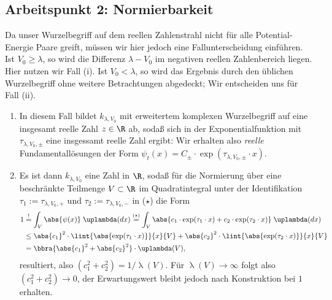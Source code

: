 \documentclass{subfiles}
\begin{document}
    \subsection{Arbeitspunkt 2: Normierbarkeit}
        Da unser Wurzelbegriff auf dem reellen Zahlenstrahl nicht für alle Potential-Energie Paare greift, müssen wir hier jedoch eine Fallunterscheidung einführen. Ist $V_0\geq \lambda$, so wird die Differenz $\lambda - V_0$ im negativen reellen Zahlenbereich liegen. Hier nutzen wir Fall (i). Ist $V_0 < \lambda$, so wird das Ergebnis durch den üblichen Wurzelbegriff ohne weitere Betrachtungen abgedeckt; Wir entscheiden uns für Fall (ii). 
        \begin{enumerate}[label=(\roman*)]
            \item In diesem Fall bildet $k_{\lambda,V_0}$ mit erweitertem komplexen Wurzelbegriff auf eine insgesamt reelle Zahl $z\in\R$ ab, sodaß sich in der Exponentialfunktion mit $\tau_{\lambda,V_0,\pm}$ eine insgessamt reelle Zahl ergibt: Wir erhalten also \emph{reelle} Fundamentallösungen der Form $\psi_t(x) = C_\pm\cdot\exp(\tau_{\lambda,V_0,\pm}\cdot x)$.
            \item Es ist dann $k_{\lambda,V_0}$ eine Zahl in $\R$, sodaß für die Normierung über eine beschränkte Teilmenge $V\subset\R$ im Quadratintegral unter der Identifikation $\tau_1 := \tau_{\lambda,V_0,+}$ und $\tau_2 := \tau_{\lambda,V_0,-}$ in ($\star$) die Form
            \begin{align*}
                1 &\stackrel{!}{=} \int_V\abs{\psi(x)}\;\uplambda(dx) \stackrel{(\star)}{=} \int_V\abs{c_1\cdot\exp(\tau_1\cdot x) + c_2\cdot\exp(\tau_2\cdot x)}\;\uplambda(dx)\\
                &\leq \abs{c_1}^2\cdot\lint{\abs{\exp(\tau_1\cdot x)}}{x}{V} + \abs{c_2}^2\cdot\lint{\abs{\exp(\tau_2\cdot x)}}{x}{V} \\
                &= \bbra{\abs{c_1}^2 + \abs{c_2}^2}\cdot \uplambda(V),
            \end{align*}
            resultiert, also $(c_1^2 + c_2^2) = 1/\uplambda(V)$. Für $\uplambda(V)\to\infty$ folgt also $(c_1^2 + c_2^2)\to 0$, der Erwartungswert bleibt jedoch nach Konstruktion bei $1$ erhalten. 
        \end{enumerate}
\end{document}
